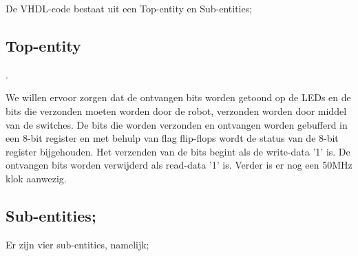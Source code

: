 \documentclass{report}
\begin{document}
De VHDL-code bestaat uit een Top-entity en Sub-entities;


\subsection{Top-entity}.

We willen ervoor zorgen dat de ontvangen bits worden getoond op de LEDs en de bits die verzonden moeten worden door de robot, verzonden worden door middel van de switches.
De bits die worden verzonden en ontvangen worden gebufferd in een 8-bit register en met behulp van flag flip-flops wordt de status van de 8-bit register bijgehouden.
Het verzenden van de bits begint als de write-data '1' is.
De ontvangen bits worden verwijderd als read-data '1' is.
Verder is er nog een 50MHz klok aanwezig.

\subsection{Sub-entities;}

Er zijn vier sub-entities, namelijk;
\end{document}
